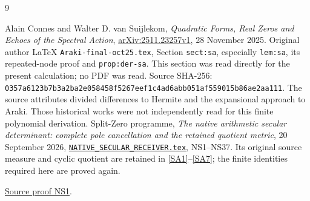 \documentclass[11pt]{article}
\begin{document}
\begin{thebibliography}{9}\raggedright
{} Alain Connes and Walter D. van Suijlekom,
\emph{Quadratic Forms, Real Zeros and Echoes of the Spectral Action},
\href{https://arxiv.org/abs/2511.23257v1}{arXiv:2511.23257v1},
28 November 2025. Original author LaTeX
\texttt{Araki-final-oct25.tex}, Section \texttt{sect:sa},
especially \texttt{lem:sa}, its repeated-node proof and
\texttt{prop:der-sa}. This section was read directly for
the present calculation; no PDF was read. Source SHA-256:
\texttt{0357a6123b7b3a2ba2e058458f5267eef1c4ad6abb051af559015b86ae2aa111}.
The source attributes divided differences to Hermite
and the expansional approach to Araki. Those historical
works were not independently read for this finite
polynomial derivation.
 Split-Zero programme,
\emph{The native arithmetic secular determinant:
complete pole cancellation and the retained quotient metric},
20 September 2026, \href{https://github.com/KokunoYumeto/zeta-function-research-reader/blob/5992ad50c0f2a06921f1fcaded7b4e38097c0739/workbenches/splitzero-tandem/continuations/20260920-original-kernel-mixed-determinants/providers/NATIVE_SECULAR_RECEIVER.tex\#L1}{\texttt{NATIVE\_SECULAR\_RECEIVER.tex}},
NS1--NS37. Its original source measure and cyclic
quotient are retained in \eqref{SA1}--\eqref{SA7};
the finite identities required here are proved again.

\href{https://github.com/KokunoYumeto/zeta-function-research-reader/blob/5992ad50c0f2a06921f1fcaded7b4e38097c0739/workbenches/splitzero-tandem/continuations/20260920-original-kernel-mixed-determinants/providers/NATIVE_SECULAR_RECEIVER.tex\#L31}{Source proof NS1}.
\end{thebibliography}
\end{document}
